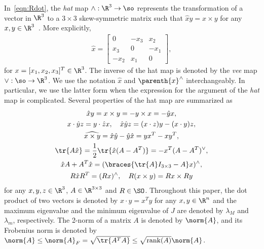 In~\cref{eqn:Rdot}, the \textit{hat} map $\wedge :\R^{3}\rightarrow\so$ represents the transformation of a vector in $\R^{3}$ to a $3\times 3$ skew-symmetric matrix such that $\hat x y = x\times y$ for any $x,y\in\R^{3}$~\cite{bullo2004}. 
More explicitly,
\begin{align*}
    \hat x = \begin{bmatrix} 0 & -x_3 & x_2 \\ x_3 & 0 & -x_1 \\ -x_2 & x_1 & 0\end{bmatrix},
\end{align*}
for $x=[x_1,x_2,x_3]^T\in\R^{3}$. 
The inverse of the hat map is denoted by the \textit{vee} map $\vee:\so\rightarrow\R^{3}$. 
We use the notation \( \hat{x}\) and \( \parenth{x}^\wedge\) interchangeably.
In particular, we use the latter form when the expression for the argument of the \textit{hat} map is complicated. 
Several properties of the hat map are summarized as
\begin{gather}
   \hat x y = x\times y = - y\times x = - \hat y x, \label{eqn:cross_product}\\
    x\cdot \hat y z = y\cdot \hat z x,\quad \hat x\hat y z = (x\cdot z) y - (x\cdot y ) z\label{eqn:STP},\\
    \widehat{x\times y} = \hat x \hat y -\hat y \hat x = yx^T-xy^T,\label{eqn:hatxy}\\
    \tr{A\hat x }=\frac{1}{2}\tr{\hat x (A-A^T)}=-x^T (A-A^T)^\vee,\label{eqn:hat1}\\
    \hat x  A+A^T\hat x=(\braces{\tr{A}I_{3\times 3}-A}x)^{\wedge}, \label{eqn:xAAx} \\
    R\hat x R^T = (Rx)^\wedge,\quad 
    R(x\times y) = Rx\times Ry\label{eqn:RxR}
\end{gather}
for any $x,y,z\in\R^{3}$, $A\in\R^{3\times 3}$ and $R\in\SO$. 
Throughout this paper, the dot product of two vectors is denoted by $x\cdot y = x^T y$ for any $x,y\in\R^n$ and the maximum eigenvalue and the minimum eigenvalue of $J$ are denoted by $\lambda_M$ and $\lambda_m$, respectively. 
The 2-norm of a matrix \( A \) is denoted by \( \norm{A} \), and its Frobenius norm is denoted by \( \norm{A} \leq \norm{A}_F = \sqrt{\tr{A^T A}} \leq \sqrt{\text{rank}(A)} \norm{A} \).

